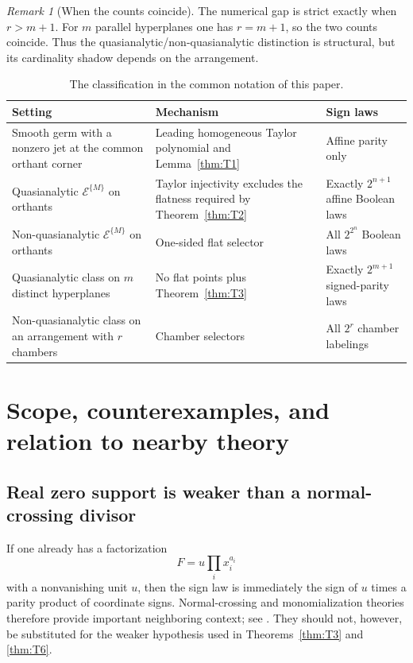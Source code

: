 \documentclass[11pt]{article}
\theoremstyle{definition}
\theoremstyle{remark}
\newtheorem{remark}[theorem]{Remark}
\begin{document}
\begin{remark}[When the counts coincide]
The numerical gap is strict exactly when $r>m+1$. For $m$ parallel hyperplanes one has $r=m+1$, so the two counts coincide. Thus the quasianalytic/non-quasianalytic distinction is structural, but its cardinality shadow depends on the arrangement.
\end{remark}

\begin{table}[t]
\centering
\caption{The classification in the common notation of this paper.}
\label{tab:summary}
\begin{tabularx}{\textwidth}{@{}>{\raggedright\arraybackslash}p{}X>{\raggedright\arraybackslash}p{}@{}}
\toprule
Setting & Mechanism & Sign laws \\
\midrule
Smooth germ with a nonzero jet at the common orthant corner & Leading homogeneous Taylor polynomial and Lemma~\ref{thm:T1} & Affine parity only \\
Quasianalytic $\mathcal{E}^{\{M\}}$ on orthants & Taylor injectivity excludes the flatness required by Theorem~\ref{thm:T2} & Exactly $2^{n+1}$ affine Boolean laws \\
Non-quasianalytic $\mathcal{E}^{\{M\}}$ on orthants & One-sided flat selector & All $2^{2^n}$ Boolean laws \\
Quasianalytic class on $m$ distinct hyperplanes & No flat points plus Theorem~\ref{thm:T3} & Exactly $2^{m+1}$ signed-parity laws \\
Non-quasianalytic class on an arrangement with $r$ chambers & Chamber selectors & All $2^r$ chamber labelings \\
\bottomrule
\end{tabularx}
\end{table}

\section{Scope, counterexamples, and relation to nearby theory}\label{sec:scope}

\subsection{Real zero support is weaker than a normal-crossing divisor}

If one already has a factorization
\[
 F=u\prod_i x_i^{a_i}
\]
with a nonvanishing unit $u$, then the sign law is immediately the sign of $u$ times a parity product of coordinate signs. Normal-crossing and monomialization theories therefore provide important neighboring context; see \cite{BierstoneMilman2004,BelottoBierstone2023}. They should not, however, be substituted for the weaker hypothesis used in Theorems~\ref{thm:T3} and \ref{thm:T6}.
\end{document}
